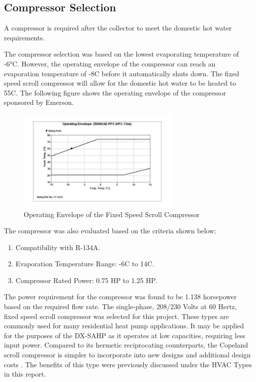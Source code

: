 \subsection{Compressor Selection}

A compressor is required after the collector to meet the domestic hot water requirements.

\medskip
The compressor selection was based on the lowest evaporating temperature of -6°C. However, the operating envelope of the compressor can reach an evaporation temperature of -8\textdegree C before it automatically shuts down. The fixed speed scroll compressor will allow for the domestic hot water to be heated to 55\textdegree C. The following figure shows the operating envelope of the compressor sponsored by Emerson.

\begin{figure}[H]
    \centering
    \includegraphics[width=8cm]{images/operating_envelope.png}
    \caption{Operating Envelope of the Fixed Speed Scroll Compressor}
\end{figure}

\medskip
The compressor was also evaluated based on the criteria shown below: 

\medskip
\begin{enumerate}[itemsep=3mm, parsep=-1mm, label=\roman*.]
    \item Compatibility with R-134A.
    \item Evaporation Temperature Range: -6\textdegree C to 14\textdegree C.
    \item Compressor Rated Power: 0.75 HP to 1.25 HP.
\end{enumerate}

\medskip
The power requirement for the compressor was found to be 1.138 horsepower based on the required flow rate. The single-phase, 208/230 Volts at 60 Hertz, fixed speed scroll compressor was selected for this project. These types are commonly used for many residential heat pump applications. It may be applied for the purposes of the DX-SAHP as it operates at low capacities, requiring less input power. Compared to its hermetic reciprocating counterparts, the Copeland scroll compressor is simpler to incorporate into new designs and additional design costs \cite{copeland}. The benefits of this type were previously discussed under the HVAC Types in this report.

